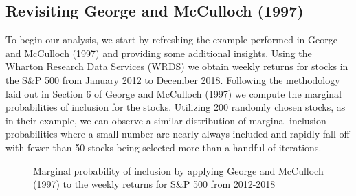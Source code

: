 \documentclass[a4paper, 12pt]{article}
\theoremstyle{plain}
\theoremstyle{definition}
\theoremstyle{remark}
\begin{document}
\subsection{Revisiting George and McCulloch (1997)}

To begin our analysis, we start by refreshing the example performed in George and McCulloch (1997) and providing some additional insights. Using the Wharton Research Data Services (WRDS) we obtain weekly returns for stocks in the S\&P 500 from January 2012 to December 2018. Following the methodology laid out in Section 6 of George and McCulloch (1997) we compute the marginal probabilities of inclusion for the stocks. Utilizing 200 randomly chosen stocks, as in their example, we can observe a similar distribution of marginal inclusion probabilities where a small number are nearly always included and rapidly fall off with fewer than 50 stocks being selected more than a handful of iterations.

\begin{figure}[H]
\hfill
{}
\caption{Marginal probability of inclusion by applying George and McCulloch (1997) to the weekly returns for S\&P 500 from 2012-2018 }
\end{figure}
\end{document}
